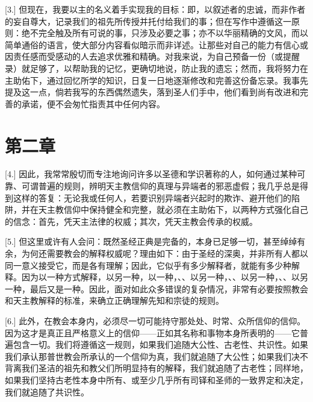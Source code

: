 [3.] 但现在，我要以主的名义着手实现我的目标：即，以叙述者的忠诚，而非作者的妄自尊大，记录我们的祖先所传授并托付给我们的事；但在写作中遵循这一原则：绝不完全触及所有可说的事，只涉及必要之事；亦不以华丽精确的文风，而以简单通俗的语言，使大部分内容看似暗示而非详述。让那些对自己的能力有信心或因责任感而受感动的人去追求优雅和精确。对我来说，为自己预备一份（或提醒录）就足够了，以帮助我的记忆，更确切地说，防止我的遗忘；然而，我将努力在主助佑下，通过回忆所学的知识，日复一日地逐渐修改和完善这份备忘录。我事先提及这一点，倘若我写的东西偶然遗失，落到圣人们手中，他们看到尚有改进和完善的承诺，便不会匆忙指责其中任何内容。\par


\section{第二章}

\par

[4.] 因此，我常常殷切而专注地询问许多以圣德和学识著称的人，如何通过某种可靠、可谓普遍的规则，辨明天主教信仰的真理与异端者的邪恶虚假；我几乎总是得到这样的答复：无论我或任何人，若要识别异端者兴起时的欺诈、避开他们的陷阱，并在天主教信仰中保持健全和完整，就必须在主助佑下，以两种方式强化自己的信念：首先，凭天主法律的权威；其次，凭天主教会传承的权威。\par

[5.] 但这里或许有人会问：既然圣经正典是完备的，本身已足够一切，甚至绰绰有余，为何还需要教会的解释权威呢？理由如下：由于圣经的深奥，并非所有人都以同一意义接受它，而是各有理解；因此，它似乎有多少解释者，就能有多少种解释。因为以一种方式解释，以另一种，以一种，、、以另一种，、、以另一种，、、以另一种，最后又是一种。因此，面对如此众多错误的复杂情况，非常有必要按照教会和天主教解释的标准，来确立正确理解先知和宗徒的规则。\par

[6.] 此外，在教会本身内，必须尽一切可能持守那处处、时常、众所信仰的信仰。因为这才是真正且严格意义上的信仰——正如其名称和事物本身所表明的——它普遍包含一切。我们将遵循这一规则，如果我们追随大公性、古老性、共识性。如果我们承认那普世教会所承认的一个信仰为真，我们就追随了大公性；如果我们决不背离我们圣洁的祖先和教父们所明显持有的解释，我们就追随了古老性；同样地，如果我们坚持古老性本身中所有、或至少几乎所有司铎和圣师的一致界定和决定，我们就追随了共识性。\par

